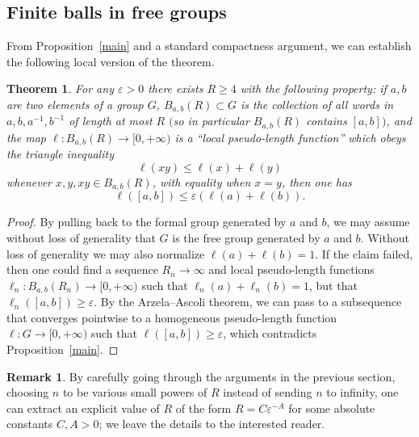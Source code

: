 \documentclass[11pt,a4paper,reqno]{amsart}
\numberwithin{equation}{section}
\theoremstyle{plain}
\newtheorem{theorem}[equation]{Theorem}
\theoremstyle{definition}
\newtheorem{remark}[equation]{Remark}
\newcommand\eps{\varepsilon}
\newcommand\normsymb{\ell}  %
\newcommand\norm[1]{\ell({#1})}   %
\newcommand\normn[1]{\ell_n({#1})}   %
\begin{document}
\subsection{Finite balls in free groups}

From Proposition~\ref{main} and a standard compactness argument, we can
establish the following local version of the theorem.

\begin{theorem}
For any $\eps>0$ there exists $R \geq 4$ with the following property: if
$a,b$ are two elements of a group $G$, $B_{a,b}(R) \subset G$ is the
collection of all words in $a,b,a^{-1},b^{-1}$ of length at most $R$
\textup{$($}so in particular $B_{a,b}(R)$ contains $[a,b]$\textup{$)$},
and the map $\normsymb: B_{a,b}(R) \to [0,+\infty)$ is a ``local
pseudo-length function'' which obeys the triangle inequality
\begin{equation}\label{tri}
 \norm{ xy } \leq \norm{x} + \norm{y}
\end{equation}
whenever $x,y,xy \in B_{a,b}(R)$, with equality when $x=y$, then one has
\[
\norm{ [a,b] } \leq \eps ( \norm{a} + \norm{b} ).
\]
\end{theorem}

\begin{proof}
By pulling back to the formal group generated by $a$ and $b$, we may
assume without loss of generality that $G$ is the free group generated by
$a$ and $b$.  Without loss of generality we may also normalize
$\norm{a}+\norm{b}=1$.  If the claim failed, then one could find a
sequence $R_n \to \infty$ and local pseudo-length functions $\normsymb_n:
B_{a,b}(R_n) \to [0,+\infty)$ such that $\normn{a}+\normn{b} = 1$, but
that $\normn{[a,b]} \geq \eps$.  By the Arzela--Ascoli theorem, we can
pass to a subsequence that converges pointwise to a homogeneous
pseudo-length function $\normsymb: G \to [0,+\infty)$ such that
$\norm{[a,b]} \geq \eps$, which contradicts Proposition~\ref{main}.
\end{proof}

\begin{remark}
By carefully going through the arguments in the previous section,
choosing $n$ to be various small powers of $R$ instead of sending $n$ to
infinity, one can extract an explicit value of $R$ of the form $R = C
\eps^{-A}$ for some absolute constants $C, A > 0$; we leave the details
to the interested reader.
\end{remark}
\end{document}

